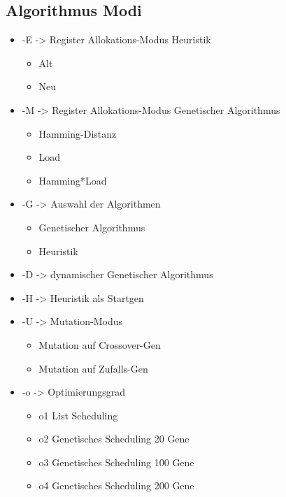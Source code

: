 \subsection{Algorithmus Modi}
\begin{itemize}
	 \setlength{\itemsep}{-6pt}
	\item-E -> Register Allokations-Modus Heuristik
			\begin{itemize}
				\setlength{\itemsep}{-4pt}
				\item Alt
				\item Neu
			\end{itemize}
	\item-M -> Register Allokations-Modus Genetischer Algorithmus
		\begin{itemize}
			\setlength{\itemsep}{-4pt}
			\item Hamming-Distanz
			\item Load
			\item Hamming*Load
		\end{itemize}
	\item-G -> Auswahl der Algorithmen
			\begin{itemize}
				\setlength{\itemsep}{-4pt}
				\item Genetischer Algorithmus
				\item Heuristik
			\end{itemize}
	\item-D -> dynamischer Genetischer Algorithmus
	\item-H -> Heuristik als Startgen
	\item-U -> Mutation-Modus
				\begin{itemize}
					\setlength{\itemsep}{-4pt}
					\item Mutation auf Crossover-Gen
					\item Mutation auf Zufalls-Gen
				\end{itemize}
	\item-o -> Optimierungsgrad
			\begin{itemize}
				\setlength{\itemsep}{-4pt}
				\item o1 List Scheduling
				\item o2 Genetisches Scheduling 20 Gene
				\item o3 Genetisches Scheduling 100 Gene
				\item o4 Genetisches Scheduling 200 Gene
			\end{itemize}
	
\end{itemize}


